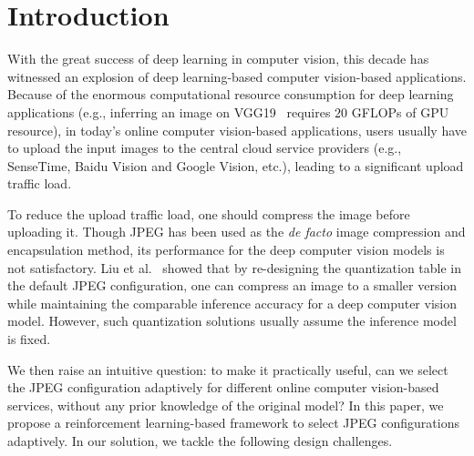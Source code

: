 \section{Introduction}
\label{Section: introduction}

With the great success of deep learning in computer vision, this decade has witnessed an explosion of deep learning-based computer vision-based applications. Because of the enormous computational resource consumption for deep learning applications (e.g., inferring an image on VGG19~\cite{VGG19} requires $20$ GFLOPs of GPU resource), in today's online computer vision-based applications, users usually have to upload the input images to the central cloud service providers (e.g., SenseTime, Baidu Vision and Google Vision, etc.), leading to a significant upload traffic load. 

To reduce the upload traffic load, one should compress the image before uploading it. Though JPEG has been used as the \emph{de facto} image compression and encapsulation method, its performance for the deep computer vision models is not satisfactory. Liu et al.~\cite{DeepN-JPEG} showed that by re-designing the quantization table in the default JPEG configuration, one can compress an image to a smaller version while maintaining the comparable inference accuracy for a deep computer vision model. However, such quantization solutions usually assume the inference model is fixed. 

We then raise an intuitive question: to make it practically useful, can we select the JPEG configuration adaptively for different online computer vision-based services, without any prior knowledge of the original model? In this paper, we propose a reinforcement learning-based framework to select JPEG configurations adaptively. In our solution, we tackle the following design challenges.

